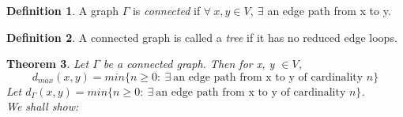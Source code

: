 \documentclass[a4paper,10pt]{book}
\newtheorem{theorem}{Theorem}[chapter]
\theoremstyle{definition}
\newtheorem{definition}[theorem]{Definition}
\theoremstyle{remark}
\numberwithin{section}{chapter}
\numberwithin{equation}{chapter}
\begin{document}
  \begin{definition}
   A graph $\Gamma$ is \emph{connected} if $\forall\ x,y \in V,\ \exists$ an edge path from x to y.
  \end{definition}
  \begin{definition}
   A connected graph is called a \emph{tree} if it has no reduced edge loops.
  \end{definition}
  \begin{theorem}
   Let $\Gamma$ be a connected graph. Then for x, y $\in V$,
   \begin{equation}
    d_{max}(x,y)=min\{n\geq 0 :\ \exists\ \text{an edge path from x to y of cardinality }n\}
   \end{equation}
  \proof
  Let $d_{\Gamma}(x,y)=min\{n\geq 0 :\ \exists\ \text{an edge path from x to y of cardinality }n\}$.\\
  We shall show:
  \begin{enumerate}
  

\end{enumerate}
\end{theorem}
\end{document}
